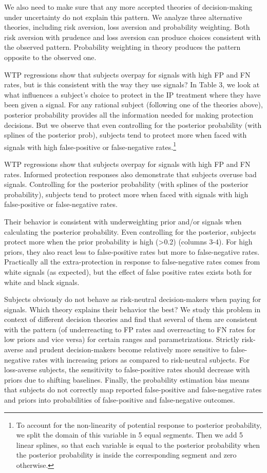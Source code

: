 \documentclass[12pt,a4paper]{article}
\begin{document}
We also need to make sure that any more accepted theories of decision-making under uncertainty do not explain this pattern.  We analyze three alternative theories, including risk aversion, loss aversion and probability weighting. Both risk aversion with prudence and loss aversion can produce choices consistent with the observed pattern. Probability weighting in theory produces the pattern opposite to the observed one.

WTP regressions show that subjects overpay for signals with high FP and FN rates, but is this consistent with the way they use signals?  In Table 3, we look at what influences a subject’s choice to protect in the IP treatment where they have been given a signal. For any rational subject (following one of the theories above), posterior probability provides all the information needed for making protection decisions. But we observe that even controlling for the posterior probability (with splines of the posterior prob), subjects tend to protect more when faced with signals with high false-positive or false-negative rates.\footnote{To account for the non-linearity of potential response to posterior probability, we split the domain of this variable in 5 equal segments. Then we add 5 linear splines, so that each variable is equal to the posterior probability when the posterior probability is inside the corresponding segment and zero otherwise.} 

WTP regressions show that subjects overpay for signals with high FP and FN rates. Informed protection responses also demonstrate that subjects overuse bad signals. Controlling for the posterior probability (with splines of the posterior probability), subjects tend to protect more when faced with signals with high false-positive or false-negative rates.

Their behavior is consistent with underweighting prior and/or signals when calculating the posterior probability. Even controlling for the posterior, subjects protect more when the prior probability is high (>0.2) (columns 3-4). For high priors, they also react less to false-positive rates but more to false-negative rates. Practically all the extra-protection in response to false-negative rates comes from white signals (as expected), but the effect of false positive rates exists both for white and black signals. 

Subjects obviously do not behave as risk-neutral decision-makers when paying for signals. Which theory explains their behavior the best? We study this problem in context of different decision theories and find that several of them are consistent with the pattern (of underreacting to FP rates and overreacting to FN rates for low priors and vice versa) for certain ranges and parametrizations. Strictly risk-averse and prudent decision-makers become relatively more sensitive to false-negative rates with increasing priors as compared to risk-neutral subjects. For loss-averse subjects, the sensitivity to false-positive rates should decrease with priors due to shifting baselines. Finally, the probability estimation bias means that subjects do not correctly map reported false-positive and false-negative rates and priors into probabilities of false-positive and false-negative outcomes.
\end{document}
